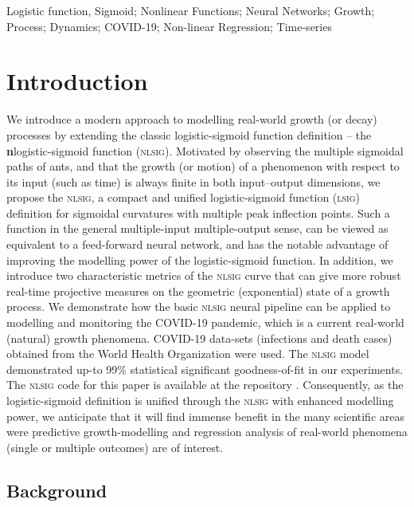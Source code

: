 \documentclass[journal]{IEEEtran}
\theoremstyle{plain}
\theoremstyle{definition}
\theoremstyle{remark}
\begin{document}
\begin{IEEEkeywords}
Logistic function, Sigmoid; Nonlinear Functions; Neural Networks; Growth; Process; Dynamics; COVID-19; Non-linear Regression; Time-series
\end{IEEEkeywords}


\section{Introduction}\label{sec_intro}

We introduce a modern approach to modelling real-world growth (or decay) processes by extending the classic logistic-sigmoid function definition -- the \textbf{n}logistic-sigmoid function (\textsc{nlsig}). Motivated by observing the multiple sigmoidal paths of ants, and that the growth (or motion) of a phenomenon  with respect to its input (such as time) is always finite in both input--output dimensions, we propose the \textsc{nlsig}, a compact and unified logistic-sigmoid function (\textsc{lsig}) definition for sigmoidal curvatures with multiple peak inflection points. Such a function in the general multiple-input multiple-output sense, can be viewed as equivalent to a feed-forward neural network, and has the notable advantage of improving the modelling power of the logistic-sigmoid function. In addition, we introduce two characteristic metrics of the \textsc{nlsig} curve that can give more robust real-time projective measures on the geometric (exponential) state of a growth process. We demonstrate how the basic \textsc{nlsig} neural pipeline can be applied to modelling and monitoring the COVID-19 pandemic, which is a current real-world (natural) growth phenomena. COVID-19 data-sets (infections and death cases) obtained from the World Health Organization were used. The \textsc{nlsig} model demonstrated up-to 99\% statistical significant goodness-of-fit in our experiments. The \textsc{nlsig} code for this paper is available at the repository \cite{somefunSomefunAgbaNLSIGCOVID19Lab2020}. Consequently, as the logistic-sigmoid definition is unified through the \textsc{nlsig} with enhanced modelling power, we anticipate that it will find immense benefit in the many scientific areas were predictive growth-modelling and regression analysis of real-world phenomena (single or multiple outcomes) are of interest.

\subsection{Background}\label{sec_backgnd}
\end{document}
